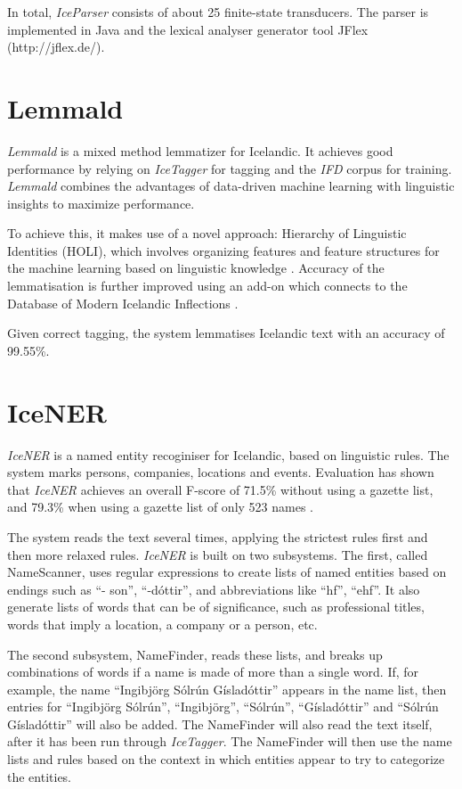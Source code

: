 \documentclass[11pt]{article}
\begin{document}
In total, \emph{IceParser} consists of about 25 finite-state transducers.
The parser is implemented in Java and the lexical analyser generator tool JFlex (http://jflex.de/).

\section{Lemmald}
\emph{Lemmald} is a mixed method lemmatizer for Icelandic.
It achieves good performance by relying on \emph{IceTagger} for tagging and the \emph{IFD} corpus for training.
\emph{Lemmald} combines the advantages of data-driven machine learning with linguistic insights to maximize performance.

To achieve this, it makes use of a novel approach: Hierarchy of Linguistic Identities (HOLI), which involves organizing features and feature structures for the machine learning based on linguistic knowledge \citep{ant08}.
Accuracy of the lemmatisation is further improved using an add-on which connects to the Database of Modern Icelandic Inflections \citep{kri05}.

Given correct tagging, the system lemmatises Icelandic text with an accuracy of 99.55\%.

\section{IceNER}
\emph{IceNER} is a named entity recoginiser for Icelandic, based on linguistic rules.
The system marks persons, companies, locations and events.
Evaluation has shown that \emph{IceNER} achieves an overall F-score of 71.5\% without using a gazette list, and 79.3\% when using a gazette list of only 523 names \citep{try09}.

The system reads the text several times, applying the strictest rules first and then more relaxed rules.
\emph{IceNER} is built on two subsystems.
The first, called NameScanner, uses regular expressions to create lists of named entities based on endings such as ``-
son'', ``-dóttir'', and abbreviations like ``hf'', ``ehf''.
It also generate lists of words that can be of significance, such as professional titles, words that imply a location, a company or a person, etc.

The second subsystem, NameFinder, reads these lists, and breaks up combinations of words if a name is made of more than a single word. If, for example, the name ``Ingibjörg Sólrún Gísladóttir'' appears in the name list, then entries for ``Ingibjörg Sólrún'', ``Ingibjörg'', ``Sólrún'', ``Gísladóttir'' and ``Sólrún Gísladóttir'' will also be added.
The NameFinder will also read the text itself, after it has been run through \emph{IceTagger}. 
The NameFinder will then use the name lists and rules based on the context in which entities appear
to try to categorize the entities. 
\end{document}
